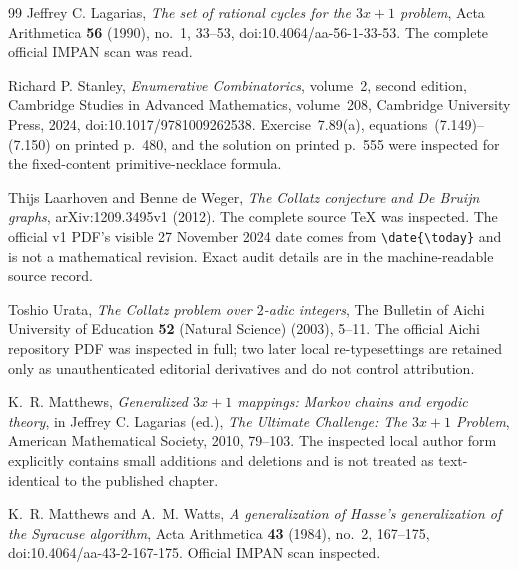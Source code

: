 \begin{thebibliography}{99}
Jeffrey C. Lagarias,
\emph{The set of rational cycles for the $3x+1$ problem},
Acta Arithmetica \textbf{56} (1990), no.~1, 33--53,
doi:10.4064/aa-56-1-33-53.  The complete official IMPAN scan was read.

Richard P. Stanley,
\emph{Enumerative Combinatorics}, volume~2, second edition,
Cambridge Studies in Advanced Mathematics, volume~208,
Cambridge University Press, 2024,
doi:10.1017/9781009262538.  Exercise~7.89(a), equations~(7.149)--(7.150)
on printed p.~480, and the solution on printed p.~555 were inspected for the
fixed-content primitive-necklace formula.

Thijs Laarhoven and Benne de Weger,
\emph{The Collatz conjecture and De Bruijn graphs},
arXiv:1209.3495v1 (2012).  The complete source TeX was inspected.  The
official v1 PDF's visible 27 November 2024 date comes from
\verb|\date{\today}| and is not a mathematical revision.  Exact audit details
are in the machine-readable source record.

Toshio Urata,
\emph{The Collatz problem over $2$-adic integers},
The Bulletin of Aichi University of Education \textbf{52} (Natural Science)
(2003), 5--11.  The official Aichi repository PDF was inspected in full; two
later local re-typesettings are retained only as unauthenticated editorial
derivatives and do not control attribution.

K.~R. Matthews,
\emph{Generalized $3x+1$ mappings: Markov chains and ergodic theory},
in Jeffrey C. Lagarias (ed.), \emph{The Ultimate Challenge: The $3x+1$
Problem}, American Mathematical Society, 2010, 79--103.  The inspected local
author form explicitly contains small additions and deletions and is not
treated as text-identical to the published chapter.

K.~R. Matthews and A.~M. Watts,
\emph{A generalization of Hasse's generalization of the Syracuse algorithm},
Acta Arithmetica \textbf{43} (1984), no.~2, 167--175,
doi:10.4064/aa-43-2-167-175.  Official IMPAN scan inspected.


\end{thebibliography}
